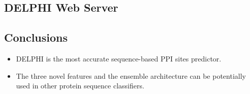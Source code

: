 \documentclass[a0,portrait]{a0poster}
\begin{document}
\begin{multicols}{2}
\begin{minipage}[b]{0.495\linewidth}
\begin{mdframed}[linewidth=7pt]
\subsection*{\color{NavyBlue}DELPHI Web Server}
\centering 
{}
\end{mdframed}
\end{minipage}


\begin{mdframed}[linewidth=7pt]

\vspace*{-30pt}
\section*{\color{NavyBlue}Conclusions}
\begin{itemize}
  \item DELPHI is the most accurate sequence-based PPI sites predictor.
  \item The three novel features and the ensemble architecture can be potentially used in other protein sequence classifiers. 
\end{itemize}
\end{mdframed}
\begin{mdframed}[linewidth=7pt]
\color{DarkSlateGray} %
\footnotesize{

}
\end{mdframed}
\end{multicols}
\end{document}
